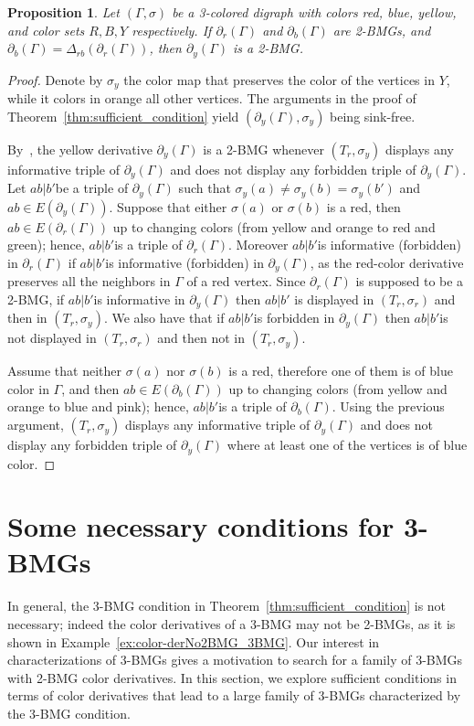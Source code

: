 \documentclass[final,3p,times]{elsarticle}
\newtheorem{proposition}[theorem]{Proposition}%
\begin{document}
\begin{proposition}\label{prop:yellow-derv}
Let $(\Gamma,\sigma)$ be a 3-colored digraph with colors red, blue, yellow, and color sets $R,B,Y$ respectively. If $\partial_r(\Gamma)$ and $\partial_b(\Gamma)$ are 2-BMGs, and $\partial_b(\Gamma)=\Delta_{rb}(\partial_r(\Gamma))$, then $\partial_{y}(\Gamma)$ is a 2-BMG.
\end{proposition}
\begin{proof}
Denote by $\sigma_y$ the color map that preserves the color of the vertices in $Y$, while it colors in orange all other vertices.
The arguments in the proof of Theorem~\ref{thm:sufficient_condition} yield $(\partial_{y}(\Gamma),\sigma_y)$ being sink-free. 

By~\cite[Proposition~2.3]{korchmaros2021quasi}, the yellow derivative $\partial_{y}(\Gamma)$ is a 2-BMG whenever $(T_r,\sigma_y)$ displays any informative triple of $\partial_{y}(\Gamma)$ and does not display any forbidden triple of $\partial_{y}(\Gamma)$. Let $ab|b'$be a triple of $\partial_{y}(\Gamma)$ such that $\sigma_y(a)\ne \sigma_y(b)=\sigma_y(b')$ and $ab\in E(\partial_{y}(\Gamma))$. Suppose that either $\sigma(a)$ or $\sigma(b)$ is a red, then $ab\in E(\partial_{r}(\Gamma))$ up to changing colors (from yellow and orange to red and green); hence, $ab|b'$is a triple of $\partial_{r}(\Gamma)$. Moreover $ab|b'$is informative (forbidden) in $\partial_{r}(\Gamma)$ if $ab|b'$is informative (forbidden) in $\partial_{y}(\Gamma)$, as the red-color derivative preserves all the neighbors in $\Gamma$ of a red vertex. Since $\partial_{r}(\Gamma)$ is supposed to be a 2-BMG, if $ab|b'$is informative in $\partial_{y}(\Gamma)$ then $ab|b'$ is displayed in $(T_r,\sigma_r)$ and then in $(T_r,\sigma_y)$. We also have that if $ab|b'$is forbidden in $\partial_{y}(\Gamma)$ then $ab|b'$is not displayed in $(T_r,\sigma_r)$ and then not in $(T_r,\sigma_y)$.

Assume that neither $\sigma(a)$ nor $\sigma(b)$ is a red, therefore one of them is of blue color in $\Gamma$, and then $ab\in E(\partial_{b}(\Gamma))$ up to changing colors (from yellow and orange to blue and pink); hence, $ab|b'$is a triple of $\partial_{b}(\Gamma)$. Using the previous argument, $(T_r,\sigma_y)$ displays any informative triple of $\partial_{y}(\Gamma)$ and does not display any forbidden triple of $\partial_{y}(\Gamma)$ where at least one of the vertices is of blue color.
\end{proof}

\section{Some necessary conditions for 3-BMGs}
\label{sec:nec_condition}
In general, the 3-BMG condition in Theorem~\ref{thm:sufficient_condition} is not necessary; indeed the color derivatives of a 3-BMG may not be 2-BMGs, as it is shown in Example~\ref{ex:color-derNo2BMG_3BMG}. 
Our interest in characterizations of 3-BMGs gives a motivation to search for a family of 3-BMGs with 2-BMG color derivatives.
In this section, we explore sufficient conditions in terms of color derivatives that lead to a large family of 3-BMGs characterized by the 3-BMG condition. 
\end{document}
